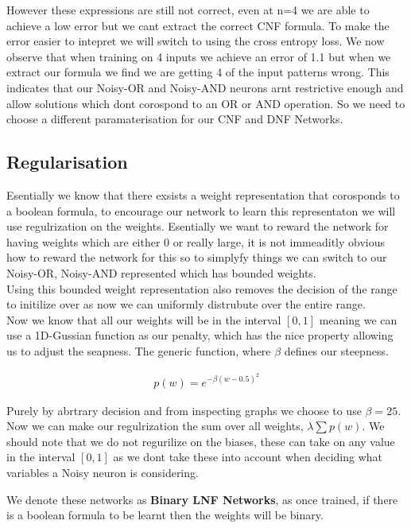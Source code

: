 \documentclass{article}
\theoremstyle{definition}
\begin{document}
However these expressions are still not correct, even at n=4 we are able to achieve a low error but we cant extract the correct CNF formula. To make the error easier to intepret we will switch to using the cross entropy loss. We now observe that when training on 4 inputs we achieve an error of 1.1 but when we extract our formula we find we are getting 4 of the input patterns wrong. This indicates that our Noisy-OR and Noisy-AND neurons arnt restrictive enough and allow solutions which dont corospond to an OR or AND operation. So we need to choose a different paramaterisation for our CNF and DNF Networks.

\subsection{Regularisation}
Esentially we know that there exsists a weight representation that corosponds to a boolean formula, to encourage our network to learn this representaton we will use regulrization on the weights. Esentially we want to reward the network for having weights which are either 0 or really large, it is not immeaditly obvious how to reward the network for this so to simplyfy things we can switch to our Noisy-OR, Noisy-AND represented which has bounded weights.\\

Using this bounded weight representation also removes the decision of the range to initilize over as now we can uniformly distrubute over the entire range.\\

Now we know that all our weights will be in the interval $[0, 1]$ meaning we can use a 1D-Gussian function as our penalty, which has the nice property allowing us to adjust the seapness. The generic function, where $\beta$ defines our steepness.

\begin{align}
p(w) = e^{-\beta (w - 0.5)^2}
\end{align}

Purely by abrtrary decision and from inspecting graphs we choose to use $\beta = 25$. Now we can make our regulrization the sum over all weights, $\lambda \sum p(w)$. We should note that we do not regurilize on the biases, these can take on any value in the interval $[0,1]$ as we dont take these into account when deciding what variables a Noisy neuron is considering.

We denote these networks as \textbf{Binary LNF Networks}, as once trained, if there is a boolean formula to be learnt then the weights will be binary.
\end{document}

